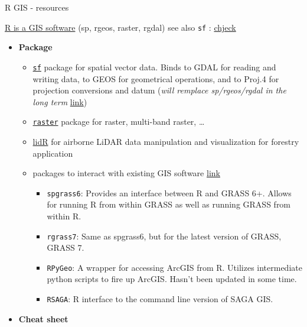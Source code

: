 \documentclass[8pt,ignorenonframetext,]{beamer}
\providecommand{\tightlist}{%
  \setlength{\itemsep}{0pt}\setlength{\parskip}{0pt}}
\begin{document}
\begin{frame}[fragile]{R GIS - resources}

\href{ftp://ftp.bgc-jena.mpg.de/pub/outgoing/mforkel/Rcourse/spatialR_2015.pdf}{R
is a GIS software} (sp, rgeos, raster, rgdal) see also \texttt{sf} :
\href{https://cran.r-project.org/web/packages/sf/vignettes/sf1.html}{chjeck}

\begin{itemize}
\tightlist
\item
  \textbf{Package}

  \begin{itemize}
  \tightlist
  \item
    \href{https://cran.r-project.org/web/packages/sf/index.html}{\texttt{sf}}
    package for spatial vector data. Binds to GDAL for reading and
    writing data, to GEOS for geometrical operations, and to Proj.4 for
    projection conversions and datum (\emph{will remplace sp/rgeos/rgdal
    in the long term}
    \href{https://github.com/r-spatial/sf/wiki/migrating}{link})
  \item
    \href{https://cran.r-project.org/web/packages/raster/index.html}{\texttt{raster}}
    package for raster, multi-band raster, \ldots{}
  \item
    \href{https://github.com/Jean-Romain/lidR}{lidR} for airborne LiDAR
    data manipulation and visualization for forestry application
  \item
    packages to interact with existing GIS software
    \href{http://jwhollister.com/r_landscape_tutorial/tutorial.html}{link}

    \begin{itemize}
    \tightlist
    \item
      \texttt{spgrass6}: Provides an interface between R and GRASS 6+.
      Allows for running R from within GRASS as well as running GRASS
      from within R.
    \item
      \texttt{rgrass7}: Same as spgrass6, but for the latest version of
      GRASS, GRASS 7.
    \item
      \texttt{RPyGeo}: A wrapper for accessing ArcGIS from R. Utilizes
      intermediate python scripts to fire up ArcGIS. Hasn't been updated
      in some time.
    \item
      \texttt{RSAGA}: R interface to the command line version of SAGA
      GIS.
    \end{itemize}
  \end{itemize}
\item
  \textbf{Cheat sheet}


\end{itemize}
\end{frame}
\end{document}
